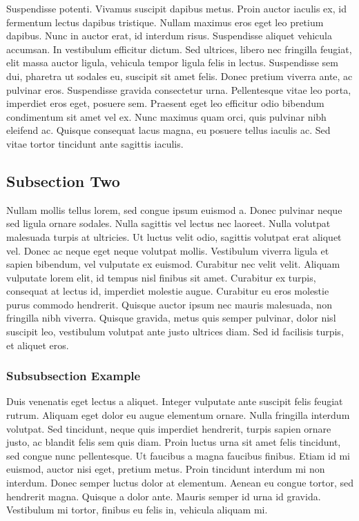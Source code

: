 \documentclass[
	a4paper, %
	10pt, %
	unnumberedsections, %
	twoside, %
]{LTJournalArticle}
\begin{document}
Suspendisse potenti. Vivamus suscipit dapibus metus. Proin auctor iaculis ex, id fermentum lectus dapibus tristique. Nullam maximus eros eget leo pretium dapibus. Nunc in auctor erat, id interdum risus. Suspendisse aliquet vehicula accumsan. In vestibulum efficitur dictum. Sed ultrices, libero nec fringilla feugiat, elit massa auctor ligula, vehicula tempor ligula felis in lectus. Suspendisse sem dui, pharetra ut sodales eu, suscipit sit amet felis. Donec pretium viverra ante, ac pulvinar eros. Suspendisse gravida consectetur urna. Pellentesque vitae leo porta, imperdiet eros eget, posuere sem. Praesent eget leo efficitur odio bibendum condimentum sit amet vel ex. Nunc maximus quam orci, quis pulvinar nibh eleifend ac. Quisque consequat lacus magna, eu posuere tellus iaculis ac. Sed vitae tortor tincidunt ante sagittis iaculis.

\subsection{Subsection Two}

Nullam mollis tellus lorem, sed congue ipsum euismod a. Donec pulvinar neque sed ligula ornare sodales. Nulla sagittis vel lectus nec laoreet. Nulla volutpat malesuada turpis at ultricies. Ut luctus velit odio, sagittis volutpat erat aliquet vel. Donec ac neque eget neque volutpat mollis. Vestibulum viverra ligula et sapien bibendum, vel vulputate ex euismod. Curabitur nec velit velit. Aliquam vulputate lorem elit, id tempus nisl finibus sit amet. Curabitur ex turpis, consequat at lectus id, imperdiet molestie augue. Curabitur eu eros molestie purus commodo hendrerit. Quisque auctor ipsum nec mauris malesuada, non fringilla nibh viverra. Quisque gravida, metus quis semper pulvinar, dolor nisl suscipit leo, vestibulum volutpat ante justo ultrices diam. Sed id facilisis turpis, et aliquet eros.

\subsubsection{Subsubsection Example}

Duis venenatis eget lectus a aliquet. Integer vulputate ante suscipit felis feugiat rutrum. Aliquam eget dolor eu augue elementum ornare. Nulla fringilla interdum volutpat. Sed tincidunt, neque quis imperdiet hendrerit, turpis sapien ornare justo, ac blandit felis sem quis diam. Proin luctus urna sit amet felis tincidunt, sed congue nunc pellentesque. Ut faucibus a magna faucibus finibus. Etiam id mi euismod, auctor nisi eget, pretium metus. Proin tincidunt interdum mi non interdum. Donec semper luctus dolor at elementum. Aenean eu congue tortor, sed hendrerit magna. Quisque a dolor ante. Mauris semper id urna id gravida. Vestibulum mi tortor, finibus eu felis in, vehicula aliquam mi.
\end{document}
